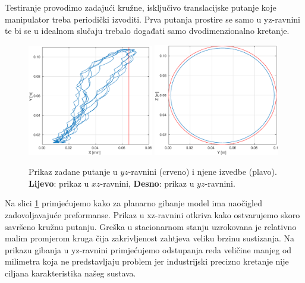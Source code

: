 \documentclass[times, utf8, diplomski, numeric]{fer}
\begin{document}
Testiranje provodimo zadajući kružne, isključivo translacijske putanje koje manipulator treba periodički izvoditi.
Prva putanja prostire se samo u yz-ravnini te bi se u idealnom slučaju trebalo događati samo dvodimenzionalno kretanje.
\begin{figure}[h!]
\centering
\includegraphics[width=0.49\textwidth]{xz_krug}
\includegraphics[width=0.49\textwidth]{yz_krug}
\caption{Prikaz zadane putanje u $yz$-ravnini (crveno) i njene izvedbe (plavo). \textbf{Lijevo}: prikaz u $xz$-ravnini, \textbf{Desno}: prikaz u $yz$-ravnini.} \label{krug_1}
\end{figure}
Na slici \ref{krug_1} primjećujemo kako za planarno gibanje model ima naočigled zadovoljavajuće preformanse.
Prikaz u xz-ravnini otkriva kako ostvarujemo skoro savršeno kružnu putanju. Greška u stacionarnom stanju uzrokovana je relativno malim promjerom kruga čija zakrivljenost zahtjeva veliku brzinu sustizanja.
Na prikazu gibanja u yz-ravnini primjećujemo odstupanja reda veličine manjeg od milimetra koja ne predstavljaju problem jer industrijski precizno kretanje nije ciljana karakteristika našeg sustava.
\end{document}

